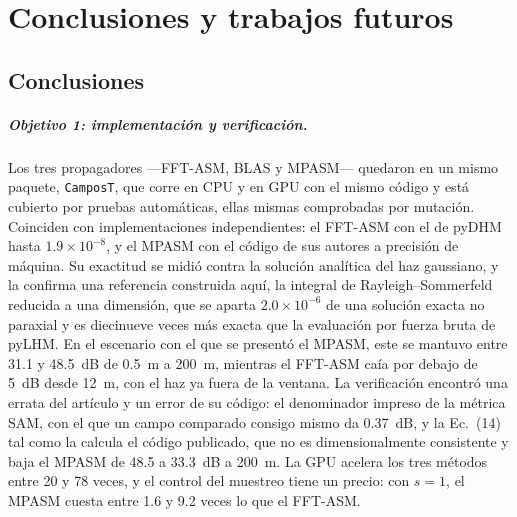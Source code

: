 \chapter{Conclusiones y trabajos futuros}
\label{cap:conclusiones}

\section{Conclusiones}

\paragraph{Objetivo 1: implementación y verificación.} Los tres propagadores
---FFT-ASM, BLAS y MPASM--- quedaron en un mismo paquete, \texttt{CamposT}, que
corre en CPU y en GPU con el mismo código y está cubierto por pruebas
automáticas, ellas mismas comprobadas por mutación. Coinciden con
implementaciones independientes: el FFT-ASM con el de pyDHM hasta
$1.9\times10^{-8}$, y el MPASM con el código de sus autores a precisión de
máquina. Su exactitud se midió contra la solución analítica del haz gaussiano,
y la confirma una referencia construida aquí, la integral de
Rayleigh--Sommerfeld reducida a una dimensión, que se aparta
$2.0\times10^{-6}$ de una solución exacta no paraxial y es diecinueve veces más
exacta que la evaluación por fuerza bruta de pyLHM. En el escenario con el que
se presentó el MPASM, este se mantuvo entre 31.1 y \SI{48.5}{dB} de
\SI{0.5}{m} a \SI{200}{m}, mientras el FFT-ASM caía por debajo de \SI{5}{dB}
desde \SI{12}{m}, con el haz ya fuera de la ventana. La verificación encontró
una errata del artículo y un error de su código: el denominador impreso de la
métrica SAM, con el que un campo comparado consigo mismo da \SI{0.37}{dB}, y la
Ec.~(14) tal como la calcula el código publicado, que no es dimensionalmente
consistente y baja el MPASM de 48.5 a \SI{33.3}{dB} a \SI{200}{m}. La GPU acelera los tres métodos
entre 20 y 78 veces, y el control del muestreo tiene un precio: con $s = 1$, el
MPASM cuesta entre 1.6 y 9.2 veces lo que el FFT-ASM.

